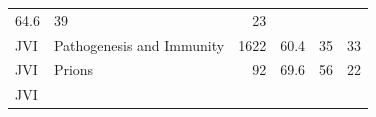 \documentclass[11pt,]{article}
\begin{document}
\begin{longtable}[]{@{}llrrrr@{}}
\begin{minipage}[t]{0.08\columnwidth}
64.6\strut
\end{minipage} & \begin{minipage}[t]{0.11\columnwidth}\raggedleft\strut
39\strut
\end{minipage} & \begin{minipage}[t]{0.11\columnwidth}\raggedleft\strut
23\strut
\end{minipage}\tabularnewline
\begin{minipage}[t]{0.06\columnwidth}\raggedright\strut
JVI\strut
\end{minipage} & \begin{minipage}[t]{0.43\columnwidth}\raggedright\strut
Pathogenesis and Immunity\strut
\end{minipage} & \begin{minipage}[t]{0.04\columnwidth}\raggedleft\strut
1622\strut
\end{minipage} & \begin{minipage}[t]{0.08\columnwidth}\raggedleft\strut
60.4\strut
\end{minipage} & \begin{minipage}[t]{0.11\columnwidth}\raggedleft\strut
35\strut
\end{minipage} & \begin{minipage}[t]{0.11\columnwidth}\raggedleft\strut
33\strut
\end{minipage}\tabularnewline
\begin{minipage}[t]{0.06\columnwidth}\raggedright\strut
JVI\strut
\end{minipage} & \begin{minipage}[t]{0.43\columnwidth}\raggedright\strut
Prions\strut
\end{minipage} & \begin{minipage}[t]{0.04\columnwidth}\raggedleft\strut
92\strut
\end{minipage} & \begin{minipage}[t]{0.08\columnwidth}\raggedleft\strut
69.6\strut
\end{minipage} & \begin{minipage}[t]{0.11\columnwidth}\raggedleft\strut
56\strut
\end{minipage} & \begin{minipage}[t]{0.11\columnwidth}\raggedleft\strut
22\strut
\end{minipage}\tabularnewline
\begin{minipage}[t]{0.06\columnwidth}\raggedright\strut
JVI\strut
\end{minipage} & \begin{minipage}[t]{0.43\columnwidth}\raggedright\strut

\end{minipage}
\end{longtable}
\end{document}

